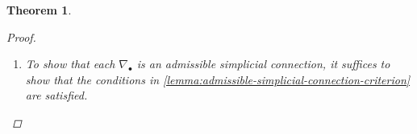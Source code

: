 \documentclass[11pt,fleqn]{article}
\theoremstyle{plain}
\newtheorem{theorem}{Theorem}[subsection]
\theoremstyle{definition}
\theoremstyle{remark}
\numberwithin{equation}{theorem}
\newcommand{\restricted}{\mathbin{\big\vert}}
\newcommand{\id}{\mathrm{id}}
\begin{document}
\begin{theorem}
\begin{proof}
\begin{enumerate}
                        The second pullback is much simpler:
                        \begin{equation*}
                            \left(\id\times f_p^i\right)^* \nabla_p
                            =
                            \left(\id\times f_p^i\right)^* \sum_{j=0}^p t_j\pi_p^*\widetilde{\nabla}_{\alpha_j}
                            =
                            \sum_{\substack{j=0\\j\neq i}}^p t_j\pi_p^*\widetilde{\nabla}_{\alpha_j}
                        \end{equation*}
                        which is `exactly the same' as the first pullback --- the scare quotes being important, because these connections are on \emph{different sheaves}.
                        But, since the horizontal arrows in \cref{equation:simplicial-condition-square} are injections, it means that these two connections really are the same when we just follow how they act on the top-left sheaf in the square; i.e., the square commutes.

                        \medskip

                        Looking ahead to \cref{equation:Ep-decomposed-into-Ep-1}, since we have extended by something \emph{compatible} on $\mathcal{K}_{p-1,i,p}$, the characteristic class of $\mathcal{K}_{p-1,i,p}$ will be 1, as mentioned above.
                        This means, by additivity of characteristic classes, that the classes of $\mathcal{E}^{p-1}\restricted U_{\alpha_0\ldots\alpha_p}$ and $\mathcal{E}^p\restricted U_{\alpha_0\ldots\alpha_p}$ will agree.
                        This is the content of half of the proof of \cite[Lemma~2.2]{Green1980}.
                    \item To show that each $\nabla_\bullet$ is an \emph{admissible} simplicial connection, it suffices to show that the conditions in \cref{lemma:admissible-simplicial-connection-criterion} are satisfied.


\end{enumerate}
\end{proof}
\end{theorem}
\end{document}
